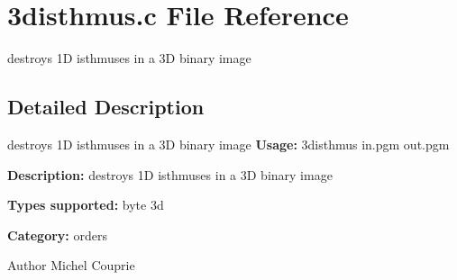 \section{3disthmus.c File Reference}
\label{3disthmus_8c}


destroys 1D isthmuses in a 3D binary image  




\subsection{Detailed Description}
destroys 1D isthmuses in a 3D binary image {\bfseries Usage:} 3disthmus in.pgm out.pgm

{\bfseries Description:} destroys 1D isthmuses in a 3D binary image

{\bfseries Types supported:} byte 3d

{\bfseries Category:} orders

\begin{DoxyAuthor}{Author}
Michel Couprie 
\end{DoxyAuthor}
